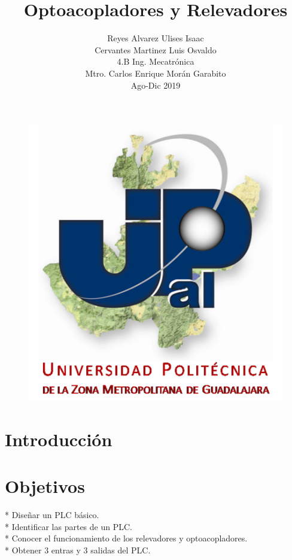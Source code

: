 \documentclass[12pt,a4paper]{article}
\author{Reyes Alvarez Ulises Isaac\\Cervantes Martinez Luis Osvaldo\\4.B   Ing. Mecatrónica\\Mtro. Carlos Enrique Morán Garabito\\Ago-Dic 2019}
\title{Optoacopladores y Relevadores}
\begin{document}
\maketitle
\begin{figure}[hbtp]
\centering
\includegraphics[scale=1.7]{Circuito/Universidad.png}
\end{figure}

\newpage
\section*{Introducción}

\section{Objetivos}
* Diseñar un PLC básico.\\
* Identificar las partes de un PLC.\\
* Conocer el funcionamiento de los relevadores y optoacopladores.\\
* Obtener 3 entras y 3 salidas del PLC.\\
\end{document}
